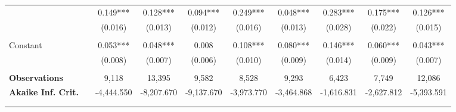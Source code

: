 \begin{tabular*}{\linewidth}{@{\extracolsep{\fill} } llcccccccc}
\hline%
\arrayrulecolor{white}%
\hline%
\arrayrulecolor{white}%
\hline%
\multirow{2}{*}{\hspace{0.2cm}500+}&&0.149***&0.128***&0.094***&0.249***&0.048***&0.283***&0.175***&0.126***\\%
&&(0.016)&(0.013)&(0.012)&(0.016)&(0.013)&(0.028)&(0.022)&(0.015)\\%
\arrayrulecolor{white}%
\hline%
\arrayrulecolor{white}%
\hline%
\arrayrulecolor{white}%
\hline%
\arrayrulecolor{white}%
\hline%
\arrayrulecolor{white}%
\hline%
&&&&&&&&&\\%
\multirow{2}{*}{Constant}&&0.053***&0.048***&0.008&0.108***&0.080***&0.146***&0.060***&0.043***\\%
&&(0.008)&(0.007)&(0.006)&(0.010)&(0.009)&(0.014)&(0.009)&(0.007)\\%
\arrayrulecolor{white}%
\hline%
\arrayrulecolor{white}%
\hline%
\arrayrulecolor{white}%
\hline%
\arrayrulecolor{white}%
\hline%
\arrayrulecolor{white}%
\hline%
&&&&&&&&&\\%
\bfseries Observations&&9,118&13,395&9,582&8,528&9,293&6,423&7,749&12,086\\%
\bfseries Akaike Inf. Crit.&&{-}4,444.550&{-}8,207.670&{-}9,137.670&{-}3,973.770&{-}3,464.868&{-}1,616.831&{-}2,627.812&{-}5,393.591\\%
\arrayrulecolor{white}%
\hline%
\arrayrulecolor{white}%
\hline%
\arrayrulecolor{white}%
\hline%
\arrayrulecolor{white}%
\hline%
\arrayrulecolor{white}%
\hline%
&&&&&&&&&\\%
\arrayrulecolor{black}%
\hline%
\end{tabular*}